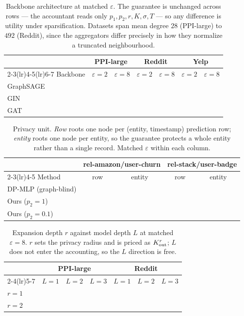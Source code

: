 \documentclass[11pt]{article}
\begin{document}
\begin{table}[H]
\centering\small
\caption{Backbone architecture at matched $\varepsilon$. The guarantee is
unchanged across rows --- the accountant reads only $p_1, p_2, r, K, \sigma, T$
--- so any difference is utility under sparsification. Datasets span mean degree
$28$ (PPI-large) to $492$ (Reddit), since the aggregators differ precisely in
how they normalize a truncated neighbourhood.}
\label{tab:backbone}
\begin{tabular}{lcccccc}
\toprule
& \multicolumn{2}{c}{PPI-large} & \multicolumn{2}{c}{Reddit} & \multicolumn{2}{c}{Yelp}\\
\cmidrule(lr){2-3}\cmidrule(lr){4-5}\cmidrule(lr){6-7}
Backbone & $\varepsilon{=}2$ & $\varepsilon{=}8$ & $\varepsilon{=}2$ & $\varepsilon{=}8$
         & $\varepsilon{=}2$ & $\varepsilon{=}8$\\
\midrule
GraphSAGE & & & & & & \\
GIN       & & & & & & \\
GAT       & & & & & & \\
\bottomrule
\end{tabular}
\end{table}

\begin{table}[H]
\centering\small
\caption{Privacy unit. \textit{Row} roots one node per (entity, timestamp)
prediction row; \textit{entity} roots one node per entity, so the guarantee
protects a whole entity rather than a single record. Matched $\varepsilon$
within each column.}
\label{tab:rooting}
\begin{tabular}{lcccc}
\toprule
& \multicolumn{2}{c}{rel-amazon/user-churn} & \multicolumn{2}{c}{rel-stack/user-badge}\\
\cmidrule(lr){2-3}\cmidrule(lr){4-5}
Method & row & entity & row & entity\\
\midrule
DP-MLP (graph-blind) & & & & \\
Ours ($p_2{=}1$)     & & & & \\
Ours ($p_2{=}0.1$)   & & & & \\
\bottomrule
\end{tabular}
\end{table}

\begin{table}[H]
\centering\small
\caption{Expansion depth $r$ against model depth $L$ at matched
$\varepsilon{=}8$. $r$ sets the privacy radius and is priced as $K_{\rm out}^r$;
$L$ does not enter the accounting, so the $L$ direction is free.}
\label{tab:r-l}
\begin{tabular}{lcccccc}
\toprule
& \multicolumn{3}{c}{PPI-large} & \multicolumn{3}{c}{Reddit}\\
\cmidrule(lr){2-4}\cmidrule(lr){5-7}
& $L{=}1$ & $L{=}2$ & $L{=}3$ & $L{=}1$ & $L{=}2$ & $L{=}3$\\
\midrule
$r = 1$ & & & & & & \\
$r = 2$ & & & & & & \\
\bottomrule
\end{tabular}
\end{table}
\end{document}
